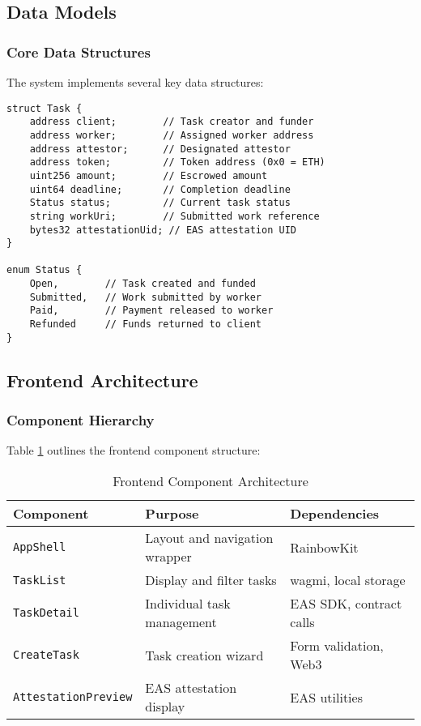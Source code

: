 \documentclass[12pt,a4paper]{article}
\begin{document}
\subsection{Data Models}

\subsubsection{Core Data Structures}

The system implements several key data structures:

\begin{lstlisting}[style=solidity]
struct Task {
    address client;        // Task creator and funder
    address worker;        // Assigned worker address
    address attestor;      // Designated attestor
    address token;         // Token address (0x0 = ETH)
    uint256 amount;        // Escrowed amount
    uint64 deadline;       // Completion deadline
    Status status;         // Current task status
    string workUri;        // Submitted work reference
    bytes32 attestationUid; // EAS attestation UID
}

enum Status {
    Open,        // Task created and funded
    Submitted,   // Work submitted by worker
    Paid,        // Payment released to worker
    Refunded     // Funds returned to client
}
\end{lstlisting}

\subsection{Frontend Architecture}

\subsubsection{Component Hierarchy}

Table \ref{tab:frontend-components} outlines the frontend component structure:

\begin{table}[h]
\centering
\begin{tabular}{|l|p{6cm}|p{4cm}|}
\hline
\textbf{Component} & \textbf{Purpose} & \textbf{Dependencies} \\
\hline
\texttt{AppShell} & Layout and navigation wrapper & RainbowKit \\
\hline
\texttt{TaskList} & Display and filter tasks & wagmi, local storage \\
\hline
\texttt{TaskDetail} & Individual task management & EAS SDK, contract calls \\
\hline
\texttt{CreateTask} & Task creation wizard & Form validation, Web3 \\
\hline
\texttt{AttestationPreview} & EAS attestation display & EAS utilities \\
\hline
\end{tabular}
\caption{Frontend Component Architecture}
\label{tab:frontend-components}
\end{table}
\end{document}

